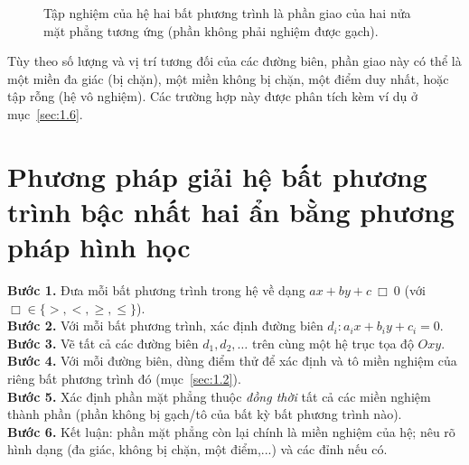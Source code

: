 \documentclass[12pt,a4paper]{report}
\begin{document}
\begin{figure}[htbp]
\centering
{}
\caption{Tập nghiệm của hệ hai bất phương trình là phần giao của hai nửa mặt phẳng tương ứng (phần không phải nghiệm được gạch).}
\label{fig:giao-hai-nua-mp}
\end{figure}

Tùy theo số lượng và vị trí tương đối của các đường biên, phần giao này có thể là một miền đa giác (bị chặn), một miền không bị chặn, một điểm duy nhất, hoặc tập rỗng (hệ vô nghiệm). Các trường hợp này được phân tích kèm ví dụ ở mục~\ref{sec:1.6}.

\section{Phương pháp giải hệ bất phương trình bậc nhất hai ẩn bằng phương pháp hình học}
\label{sec:1.4}

\begin{methodbox}
\textbf{Bước 1.} Đưa mỗi bất phương trình trong hệ về dạng $ax+by+c\ \Box\ 0$ (với $\Box\in\{>,<,\ge,\le\}$).\\
\textbf{Bước 2.} Với mỗi bất phương trình, xác định đường biên $d_i: a_ix+b_iy+c_i=0$.\\
\textbf{Bước 3.} Vẽ tất cả các đường biên $d_1,d_2,\dots$ trên cùng một hệ trục tọa độ $Oxy$.\\
\textbf{Bước 4.} Với mỗi đường biên, dùng điểm thử để xác định và tô miền nghiệm của riêng bất phương trình đó (mục~\ref{sec:1.2}).\\
\textbf{Bước 5.} Xác định phần mặt phẳng thuộc \emph{đồng thời} tất cả các miền nghiệm thành phần (phần không bị gạch/tô của bất kỳ bất phương trình nào).\\
\textbf{Bước 6.} Kết luận: phần mặt phẳng còn lại chính là miền nghiệm của hệ; nêu rõ hình dạng (đa giác, không bị chặn, một điểm,...) và các đỉnh nếu có.
\end{methodbox}
\end{document}
